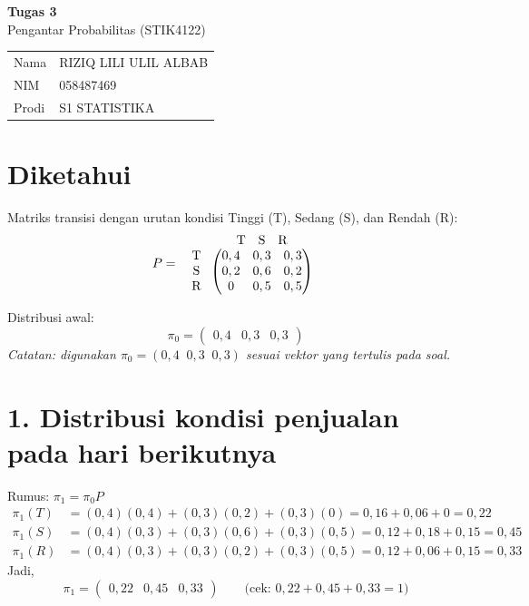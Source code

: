 \documentclass[12pt,a4paper]{article}
\begin{document}
\begin{center}
  {\Large\bfseries Tugas 3}\\[2pt]
  {\large Pengantar Probabilitas (STIK4122)}
\end{center}

\begin{tabular}{@{}l@{\;:\;}l}
  Nama  & RIZIQ LILI ULIL ALBAB \\
  NIM   & 058487469 \\
  Prodi & S1 STATISTIKA
\end{tabular}

\section*{Diketahui}

Matriks transisi dengan urutan kondisi Tinggi (T), Sedang (S), dan Rendah (R):
\[
P =
\begin{array}{c@{\;}c}
  & \begin{array}{ccc} \text{T} & \text{S} & \text{R} \end{array} \\
  \begin{array}{c} \text{T} \\ \text{S} \\ \text{R} \end{array} &
  \begin{pmatrix}
    0,4 & 0,3 & 0,3 \\
    0,2 & 0,6 & 0,2 \\
    0   & 0,5 & 0,5
  \end{pmatrix}
\end{array}
\]

Distribusi awal:
\[
\pi_0 = \begin{pmatrix} 0,4 & 0,3 & 0,3 \end{pmatrix}
\]
\textit{Catatan: digunakan $\pi_0 = (0,4 \;\; 0,3 \;\; 0,3)$ sesuai vektor yang tertulis pada soal.}

\section*{1. Distribusi kondisi penjualan pada hari berikutnya}

Rumus: $\pi_1 = \pi_0 P$
\begin{align*}
\pi_1(T) &= (0,4)(0,4) + (0,3)(0,2) + (0,3)(0) = 0,16 + 0,06 + 0 = 0,22 \\
\pi_1(S) &= (0,4)(0,3) + (0,3)(0,6) + (0,3)(0,5) = 0,12 + 0,18 + 0,15 = 0,45 \\
\pi_1(R) &= (0,4)(0,3) + (0,3)(0,2) + (0,3)(0,5) = 0,12 + 0,06 + 0,15 = 0,33
\end{align*}
Jadi,
\[
\boxed{\pi_1 = \begin{pmatrix} 0,22 & 0,45 & 0,33 \end{pmatrix}}
\qquad \text{(cek: } 0,22 + 0,45 + 0,33 = 1\text{)}
\]
\end{document}
